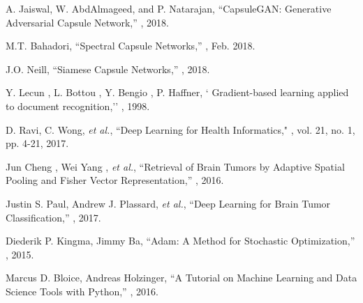 \documentclass{article}
\begin{document}
\begin{thebibliography}{10}
A. Jaiswal, W. AbdAlmageed, and P. Natarajan,
\newblock ``CapsuleGAN: Generative Adversarial Capsule Network,''
, 2018.

M.T. Bahadori,
\newblock ``Spectral Capsule Networks,''
, Feb. 2018.

J.O. Neill,
\newblock ``Siamese Capsule Networks,''
, 2018.

 Y. Lecun , L. Bottou , Y. Bengio , P. Haffner,
\newblock ` Gradient-based learning applied to document recognition,''
, 1998.

D. Ravi, C. Wong, {\em et al.},
\newblock ``Deep Learning for Health Informatics,"
, vol. 21, no. 1, pp. 4-21, 2017.


Jun Cheng , Wei Yang , \textit{et al.},
\newblock ``Retrieval of Brain Tumors by Adaptive Spatial Pooling and Fisher Vector Representation,''
, 2016.

Justin S. Paul, Andrew J. Plassard, \textit{et al.},
\newblock ``Deep Learning for Brain Tumor Classification,''
, 2017.

Diederik P. Kingma, Jimmy Ba,
\newblock ``Adam: A Method for Stochastic Optimization,''
, 2015.

Marcus D. Bloice, Andreas Holzinger,
\newblock ``A Tutorial on Machine Learning and Data Science Tools with Python,''
, 2016.\\


\end{thebibliography}
\end{document}
